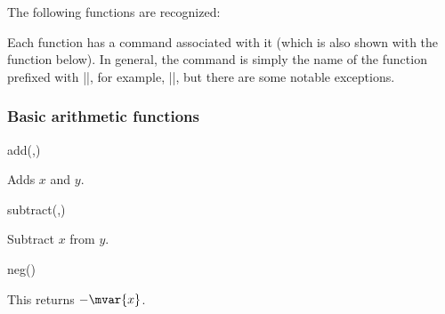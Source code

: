 \label{pgfmath-functions}

The following functions are recognized:

\medskip
\def\mathlink#1{\hyperlink{math:#1}{\tt#1}}
\bigskip

Each function has a \pgfname{} command associated with it (which is
also shown with the function below). In general, the command
is simply the name of the function prefixed with |\pgfmath|, for
example, |\pgfmathadd|, but there are some notable exceptions.

\subsubsection{Basic arithmetic functions}

\label{pgfmath-functions-basic}

\begin{math-function}{add(,)}
\mathcommand

  Adds $x$ and $y$.

\begin{codeexample}[]
 \pgfmathresult
\end{codeexample}
\end{math-function}

\begin{math-function}{subtract(,)}
\mathcommand

  Subtract $x$ from $y$.

\begin{codeexample}[]
 \pgfmathresult
\end{codeexample}
\end{math-function}

\begin{math-function}{neg()}
\mathcommand

	This returns $-\mvar{x}$.
	
\begin{codeexample}[]
 \pgfmathresult
\end{codeexample}

\end{math-function}

